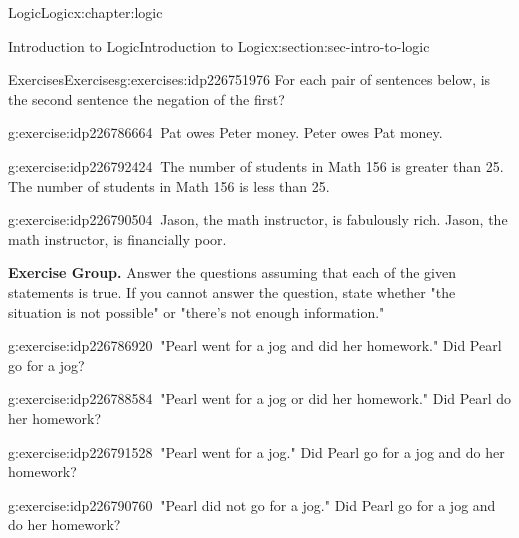 \documentclass[twoside,10pt,]{book}
\numberwithin{equation}{section}
\begin{document}
\begin{chapterptx}{Logic}{}{Logic}{}{}{x:chapter:logic}
\begin{sectionptx}{Introduction to Logic}{}{Introduction to Logic}{}{}{x:section:sec-intro-to-logic}
\begin{exercises-subsection}{Exercises}{}{Exercises}{}{}{g:exercises:idp226751976}
For each pair of sentences below, is the second sentence the negation of the first?\begin{exercisegroup}
\begin{divisionexerciseeg}{27}{}{}{g:exercise:idp226786664}%
\(\ \)Pat owes Peter money.  Peter owes Pat money.\end{divisionexerciseeg}%
\begin{divisionexerciseeg}{28}{}{}{g:exercise:idp226792424}%
\(\ \)The number of students in Math 156 is greater than 25.  The number of students in Math 156 is less than 25.\end{divisionexerciseeg}%
\begin{divisionexerciseeg}{29}{}{}{g:exercise:idp226790504}%
\(\ \)Jason, the math instructor, is fabulously rich.  Jason, the math instructor, is financially poor.\end{divisionexerciseeg}%
\end{exercisegroup}
\par\medskip\noindent
\par\medskip\noindent%
\textbf{Exercise Group.}\space\space%
Answer the questions assuming that each of the given statements is true.  If you cannot answer the question, state whether "the situation is not possible" or "there's not enough information."\begin{exercisegroup}
\begin{divisionexerciseeg}{30}{}{}{g:exercise:idp226786920}%
\(\ \)"Pearl went for a jog and did her homework."  Did Pearl go for a jog?\end{divisionexerciseeg}%
\begin{divisionexerciseeg}{31}{}{}{g:exercise:idp226788584}%
\(\ \)"Pearl went for a jog or did her homework."  Did Pearl do her homework?\end{divisionexerciseeg}%
\begin{divisionexerciseeg}{32}{}{}{g:exercise:idp226791528}%
\(\ \)"Pearl went for a jog."  Did Pearl go for a jog and do her homework?\end{divisionexerciseeg}%
\begin{divisionexerciseeg}{33}{}{}{g:exercise:idp226790760}%
\(\ \)"Pearl did not go for a jog."  Did Pearl go for a jog and do her homework?\end{divisionexerciseeg}%
\end{exercisegroup}
\par\medskip\noindent
\end{exercises-subsection}
%
%
\typeout{************************************************}

\end{sectionptx}
\end{chapterptx}
\end{document}
